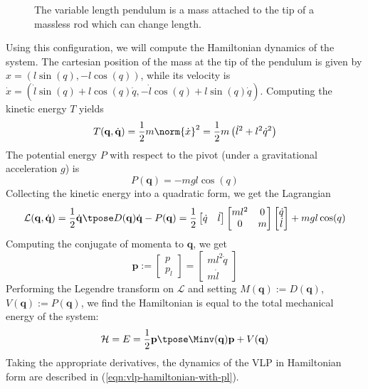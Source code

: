 \begin{figure}
   \centering
   
   \caption{The variable length pendulum is a mass attached to the
      tip of a massless rod which can change length.}\label{fig:vlp-model}
\end{figure}

Using this configuration, we will compute the Hamiltonian dynamics of the system.
The cartesian position of the mass at the tip of the pendulum
is given by \(x = (l\sin(q),-l\cos(q))\), while its velocity is
\(\dot{x} = (\dot{l}\sin(q) + l\cos(q)\dot{q}, -\dot{l}\cos(q) + l\sin(q)\dot{q})\).
Computing the kinetic energy \(T\) yields
\[
   T(\mathbf{q},\dot{\mathbf{q}}) = 
   \frac{1}{2}m\norm{\dot{x}}^2 = \frac{1}{2}m\left(\dot{l}^2 + l^2\dot{q}^2\right)
\]
The potential energy \(P\) with respect to the pivot (under a gravitational
acceleration \(g\)) is
\[
   P(\mathbf{q}) = -mgl\cos(q)
\]
Collecting the kinetic energy into a quadratic form, we get the Lagrangian
\[
   \mathcal{L}(\mathbf{q},\dot{\mathbf{q}}) 
   = \frac{1}{2} \dot{\mathbf{q}}\tpose D(\mathbf{q})\dot{\mathbf{q}} - P(\mathbf{q})
   = \frac{1}{2}
   \begin{bmatrix} \dot{q} & \dot{l} \end{bmatrix}
   \begin{bmatrix}
      ml^2 & 0 \\
      0 & m \\
   \end{bmatrix}
   \begin{bmatrix} 
      \dot{q} \\ \dot{l}
   \end{bmatrix}
   + mgl\cos(q)
\]
Computing the conjugate of momenta to \(\mathbf{q}\), we get 
\[
   \mathbf{p} := \begin{bmatrix} p \\ p_l \end{bmatrix} 
   = \begin{bmatrix} ml^2\dot{q} \\ m\dot{l} \end{bmatrix} 
\]
Performing the Legendre transform on \(\mathcal{L}\) and setting
\(M(\mathbf{q}) := D(\mathbf{q})\), \(V(\mathbf{q}) := P(\mathbf{q})\),
we find the Hamiltonian is equal to the total mechanical energy of the system:
\[
   \mathcal{H} = E = \frac{1}{2}\mathbf{p}\tpose \Minv(\mathbf{q})
   \mathbf{p}+V(\mathbf{q})
\]
Taking the appropriate derivatives, the dynamics of the VLP in Hamiltonian form
are described in (\ref{eqn:vlp-hamiltonian-with-pl}). 
